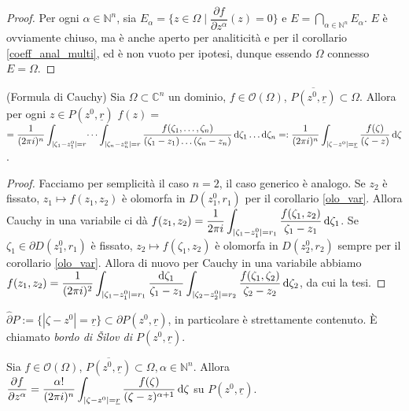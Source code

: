 \begin{proof}
  Per ogni $\alpha \in \mathbb{N}^n$, sia $E_\alpha=\{z \in \Omega \mid \dfrac{\partial f}{\partial z^\alpha}(z)=0\}$ e $\displaystyle E=\bigcap_{\alpha \in \mathbb{N}^n} E_\alpha$.
  $E$ è ovviamente chiuso, ma è anche aperto per analiticità e per il corollario \ref{coeff_anal_multi}, ed è non vuoto per ipotesi, dunque essendo $\Omega$ connesso $E=\Omega$.
\end{proof}

\begin{prop}
  (Formula di Cauchy) Sia $\Omega \subset \mathbb{C}^n$ un dominio, $f \in \mathcal{O}(\Omega)$, $\overline{P(z^0,\underline{r})} \subset \Omega$. Allora per ogni $z \in P(z^0, \underline{r})$ $\displaystyle f(z)=$\\
  $\displaystyle =\dfrac{1}{(2\pi i)^n} \int_{|\zeta_1-z_1^0|=r}\dots\int_{|\zeta_n-z_n^0|=r} \frac{f(\zeta_1,\dots,\zeta_n)}{(\zeta_1-z_1)\dots(\zeta_n-z_n)}\mathop{}\!\mathrm{d}\zeta_1\dots\mathop{}\!\mathrm{d}\zeta_n=: \dfrac{1}{(2\pi i)^n} \int_{|\zeta-z^0|=\underline{r}} \dfrac{f(\zeta)}{(\zeta-z)}\mathop{}\!\mathrm{d} \zeta$.
\end{prop}

\begin{proof}
  Facciamo per semplicità il caso $n=2$, il caso generico è analogo. Se $z_2$ è fissato, $z_1 \longmapsto f(z_1, z_2)$ è olomorfa in $D(z^0_1, r_1)$ per il corollario \ref{olo_var}. Allora Cauchy in una variabile ci dà $\displaystyle f(z_1,z_2)=\frac{1}{2\pi i} \int_{|\zeta_1-z^0_1|=r_1} \frac{f(\zeta_1, z_2)}{\zeta_1-z_1}\mathop{}\!\mathrm{d}\zeta_1$.
  Se $\zeta_1 \in \partial D(z^0_1, r_1)$ è fissato, $z_2 \longmapsto f(\zeta_1,z_2)$ è olomorfa in $D(z^0_2, r_2)$ sempre per il corollario \ref{olo_var}.
  Allora di nuovo per Cauchy in una variabile abbiamo $\displaystyle f(z_1, z_2)=\frac{1}{(2\pi i)^2} \int_{|\zeta_1-z_1^0|=r_1} \frac{\mathop{}\!\mathrm{d} \zeta_1}{\zeta_1-z_1}\int_{|\zeta_2-z_2^0|=r_2} \frac{f(\zeta_1,\zeta_2)}{\zeta_2-z_2}\mathop{}\!\mathrm{d}\zeta_2$, da cui la tesi.
\end{proof}

\begin{oss}
  $\hat{\partial}P:=\{|\zeta-z^0|=\underline{r}\} \subset \partial P(z^0, \underline{r})$, in particolare è strettamente contenuto. È chiamato \textit{bordo di Šilov di $P(z^0, \underline{r})$}.
\end{oss}

\begin{cor}
  Sia $f \in \mathcal{O}(\Omega)$, $\overline{P(z^0, \underline{r})} \subset \Omega, \alpha \in \mathbb{N}^n$. Allora $\displaystyle \frac{\partial f}{\partial z^\alpha}=\dfrac{\alpha!}{(2\pi i)^n} \int_{|\zeta-z^0|=\underline{r}} \frac{f(\zeta)}{(\zeta-z)^{\alpha+1}}\mathop{}\!\mathrm{d} \zeta$ su $P(z^0, \underline{r})$.
\end{cor}

